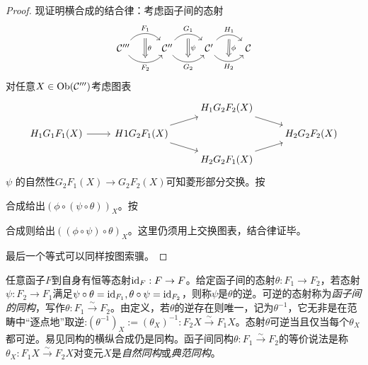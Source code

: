 \begin{Lem}
\begin{proof}
        现证明横合成的结合律：考虑函子间的态射
        \[\begin{tikzcd}
            \mathcal{C}'''
                \arrow[bend left = 50, r, "F_1", ""' name = U1]
                \arrow[bend right = 50, r, "" name = D1, "F_2"'] &
            \mathcal{C}''
                \arrow[bend left = 50, r, "G_1", ""' name = U2]
                \arrow[bend right = 50, r, "" name = D2, "G_2"'] &
            \mathcal{C}'
                \arrow[bend left = 50, r, "H_1", ""' name = U3]
                \arrow[bend right = 50, r, "" name = D3, "H_2"'] &
            \mathcal{C}
            \arrow[Rightarrow, to path = (U1)--(D1) \tikztonodes, "\theta"]
            \arrow[Rightarrow, to path = (U2)--(D2) \tikztonodes, "\psi"]
            \arrow[Rightarrow, to path = (U3)--(D3) \tikztonodes, "\phi"]
        \end{tikzcd}\]
        对任意$X\in \operatorname{Ob}(\mathcal{C}''')$考虑图表
        \[\begin{tikzcd}[row sep=small]
            & & H_1 G_2 F_2 (X)\arrow[rd] & \\
        H_1 G_1 F_1 (X)
            \arrow[r] &
        H1 G_2 F_1 (X)
            \arrow[ru]
            \arrow[rd] & &
        H_2 G_2 F_2 (X) \\
            & & H_2 G_2 F_1 (X)
                \arrow[ru] & 
        \end{tikzcd}\]
        $\psi$ 的自然性$G_2 F_1(X)\to G_2 F_2 (X)$可知菱形部分交换。按
        合成给出$(\phi \circ (\psi \circ \theta))_X$。按
        合成则给出$((\phi \circ \psi) \circ \theta)_X$。这里仍须用上交换图表，结合律证毕。

        最后一个等式可以同样按图索骥。
    \end{proof}
\end{Lem}
    任意函子$F$到自身有恒等态射$\mathrm{id}_F:F\to F$。给定函子间的态射$\theta:F_1\to F_2$，若态射$\psi:F_2 \to F_1$满足$\psi \circ \theta=\mathrm{id}_{F_1}, \theta \circ \psi = \mathrm{id}_{F_2}$，则称$\psi$是$\theta$的逆。可逆的态射称为\emph{函子间的同构}，写作$\theta:F_1 \xrightarrow{\sim} F_2$。由定义，若$\theta$的逆存在则唯一，记为$\theta^{-1}$，它无非是在范畴中“逐点地”取逆:$(\theta^{-1})_X:=(\theta_X)^{-1}:F_2X \xrightarrow{\sim}F_1X$。态射$\theta$可逆当且仅当每个$\theta_X$都可逆。易见同构的横纵合成仍是同构。函子间同构$\theta:F_1 \xrightarrow{\sim} F_2$的等价说法是称$\theta_X:F_1 X \xrightarrow{\sim}F_2 X$对变元$X$是\emph{自然同构}或\emph{典范同构}。

